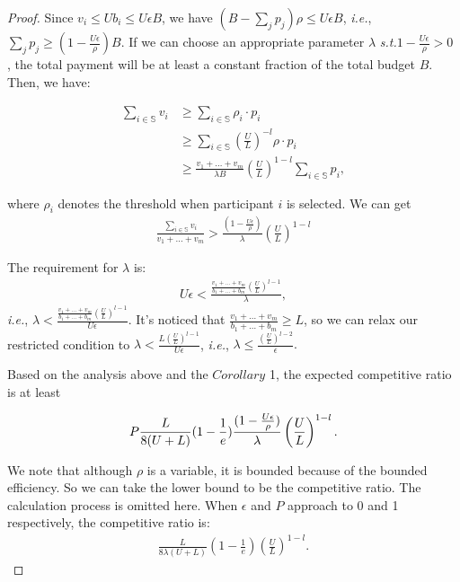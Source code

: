 \documentclass[10pt,journal,letterpaper,compsoc]{IEEEtran}
\newcommand{\ie}{{\em i.e.}}
\newcommand{\st}{{\em s.t.}}
\begin{document}
\begin{proof}
Since $v_i \le Ub_i \le U\epsilon B$, we have $(B-\sum_j{p_j})\rho \le U\epsilon B$, \ie, $\sum_j{p_j} \ge (1-\frac{U\epsilon}{\rho})B$. If we can choose an appropriate parameter $\lambda$  \st  $1-\frac{U\epsilon}{\rho} > 0$ , the total payment will be at least a constant fraction of the total budget $B$. Then, we have:
\begin{small}
\begin{align}
\nonumber \sum_{i \in\mathbb{S}} v_i &\ge \sum_{i \in\mathbb{S}}\rho_{i} \cdot p_i \\
\nonumber &\ge \sum_{i \in\mathbb{S}}\left(\frac{U}{L}\right)^{-l}\rho \cdot p_i\\
&\ge \frac{v_1+\dots+v_m}{\lambda B}\left(\frac{U}{L}\right)^{1-l}\sum_{i \in\mathbb{S}}p_i,
\end{align}
\end{small}
where $\rho_i$ denotes the threshold when participant $i$ is selected. We can get
\begin{eqnarray}
\frac{\sum_{i \in\mathbb{S}}v_i}{v_1+\dots+v_m} > \frac{ (1-\frac{U\epsilon}{\rho})}{\lambda}\left(\frac{U}{L}\right)^{1-l}
\end{eqnarray}

The requirement for $\lambda$ is:
\begin{align}
 \nonumber U\epsilon < \frac{\frac{v_1+\dots+v_m}{b_1+\dots+b_m}\left(\frac{U}{L}\right)^{l-1}}{\lambda}, 
 \end{align}
 \ie, $ \lambda < \frac{\frac{v_1+\dots+v_m}{b_1+\dots+b_m}\left(\frac{U}{L}\right)^{l-1}}{U\epsilon}. $  It's noticed that $\frac{v_1+\dots+v_m}{b_1+\dots+b_m} \ge L$, so we can relax our restricted condition to $ \lambda < \frac{L\left(\frac{U}{L}\right)^{l-1}}{U\epsilon}$, \ie, $\lambda \le \frac{\left(\frac{U}{L}\right)^{l-2}}{\epsilon}.$

Based on the analysis above and the $Corollary$ 1, the expected competitive ratio is at least
\begin{small}
\begin{eqnarray}
\small
P\frac{L}{8(U+L)}(1-\frac{1}{e})\frac{ (1-\frac{U\epsilon}{\rho })}{\lambda}\left(\frac{U}{L}\right)^{1-l}.
\end{eqnarray}
\end{small}

We note that although $\rho$ is a variable, it is bounded because of the bounded efficiency. So we can take the lower bound to be the competitive ratio. The calculation process is omitted here. When $\epsilon$ and $P$ approach to 0 and 1 respectively, the competitive ratio is:
\begin{eqnarray}
\frac{L}{8\lambda(U+L)}(1-\frac{1}{e})\left(\frac{U}{L}\right)^{1-l}.
\end{eqnarray}


\end{proof}
\end{document}
